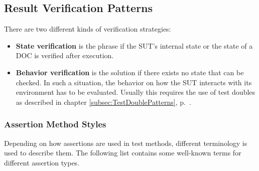     \subsection{Result Verification Patterns} \label{subsec:ResultVerificationPatterns}
        There are two different kinds of verification strategies:
        \begin{itemize}
            \item \textbf{State verification}
                    is the phrase if the SUT's internal state or the state of a DOC is verified after execution.
            \item \textbf{Behavior verification}
                    is the solution if there exists no state that can be checked.
                    In such a situation, the behavior on how the SUT interacts with its environment has to be evaluated.
                    Usually this requires the use of test doubles as described in chapter \ref{subsec:TestDoublePatterns}, p.~\pageref{subsec:TestDoublePatterns}.
        \end{itemize}

        \subsubsection{Assertion Method Styles}
            Depending on how assertions are used in test methods, different terminology is used to describe them.
            The following list contains some well-known terms for different assertion types.

